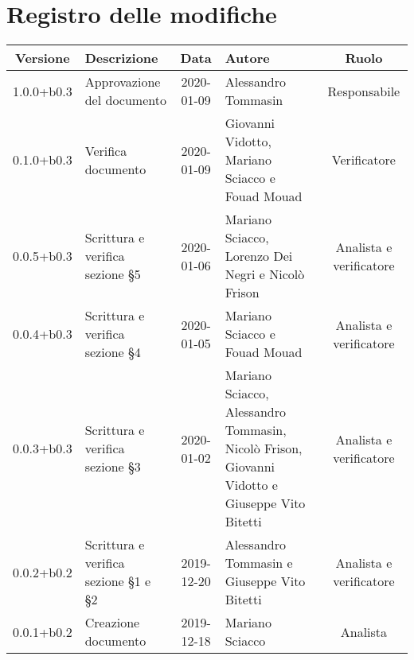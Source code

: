 \section*{Registro delle modifiche}

\begin{center}
	\begin{longtable}{|c|p{3cm}|c|p{4cm}|c|}
	\hline
	\rowcolor{lighter-grayer}
	\textbf{Versione} & \textbf{Descrizione} & \textbf{Data} & \textbf{Autore} & \textbf{Ruolo} \\
	\hline
	\endfirsthead

	1.0.0+b0.3 & Approvazione del documento & 2020-01-09 & Alessandro Tommasin & Responsabile \\
	\hline
	0.1.0+b0.3 & Verifica documento & 2020-01-09 & Giovanni Vidotto, Mariano Sciacco e Fouad Mouad & Verificatore \\
	\hline
	0.0.5+b0.3 & Scrittura e verifica sezione \S5 & 2020-01-06 & Mariano Sciacco, Lorenzo Dei Negri e Nicolò Frison & Analista e verificatore \\
	\hline
	0.0.4+b0.3 & Scrittura e verifica sezione \S4 & 2020-01-05 & Mariano Sciacco e Fouad Mouad & Analista e verificatore \\
	\hline
	0.0.3+b0.3 & Scrittura e verifica sezione \S3 & 2020-01-02 & Mariano Sciacco, Alessandro Tommasin, Nicolò Frison, Giovanni Vidotto e Giuseppe Vito Bitetti & Analista e verificatore \\
	\hline
	0.0.2+b0.2 & Scrittura e verifica sezione \S1 e \S2 & 2019-12-20 & Alessandro Tommasin e Giuseppe Vito Bitetti & Analista e verificatore \\
	\hline
	0.0.1+b0.2 & Creazione documento & 2019-12-18 & Mariano Sciacco & Analista \\
	\hline

	\end{longtable}
\end{center}
